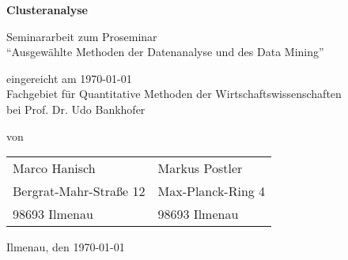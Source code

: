 \begin{titlepage}

\begin{center}
\vspace{1cm}
\large{\textbf{Clusteranalyse}}

\vspace{2cm}

\large{Seminararbeit zum Proseminar} \\ 
``Ausgewählte Methoden der Datenanalyse und des Data Mining'' \\

\vspace{4cm}

eingereicht am \today \\
Fachgebiet für Quantitative Methoden der Wirtschaftswissenschaften \\
bei Prof. Dr. Udo Bankhofer \\

\vspace{4cm}

von \\
\vspace{1cm}
\begin{tabular}{l|l}
   Marco Hanisch & Markus Postler \\ 
   Bergrat-Mahr-Straße 12 & Max-Planck-Ring 4 \\ 
   98693 Ilmenau & 98693 Ilmenau \\ 
 \end{tabular}

\vspace{6cm}

Ilmenau, den \today
\end{center}

\end{titlepage}
